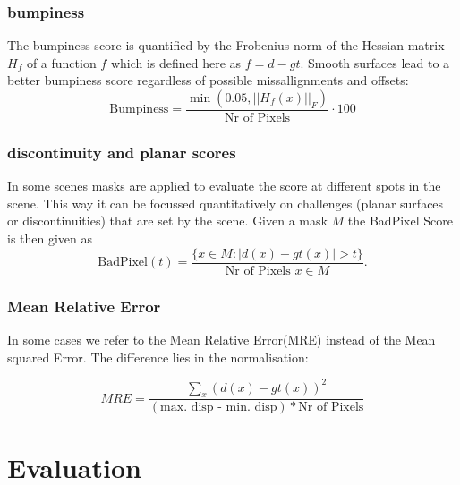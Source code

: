 \documentclass  [
  paper    = a4,
  BCOR     = 10mm,
  twoside,
  fontsize = 12pt,
  fleqn,
  toc      = bibnumbered,
  toc      = listofnumbered,
  numbers  = noendperiod,
  headings = normal,
  listof   = leveldown,
  version  = 3.03
]                                       {scrreprt}
\begin{document}
\subsection{bumpiness}
The bumpiness score is quantified by the Frobenius norm of the Hessian matrix $H_f$ of a function $f$ which is defined here as $f = d-gt$. Smooth surfaces lead to a better bumpiness score regardless of possible missallignments and offsets:
\begin{equation}\label{key}
\text{Bumpiness} = \frac{\min(0.05, ||H_f(x)||_F)}{\text{Nr of Pixels}} \cdot 100
\end{equation}
\subsection{discontinuity and planar scores}
In some scenes masks are applied to evaluate the score at different spots in the scene. This way it can be focussed quantitatively on challenges (planar surfaces or discontinuities) that are set by the scene. Given a mask $M$ the BadPixel Score is then given as 
\begin{equation}\label{key}
\text{BadPixel}(t) = \frac{\{x \in M:|d(x) - gt(x)| > t \}}{\text{Nr of Pixels }x \in M}.
\end{equation}
\subsection{Mean Relative Error}
In some cases we refer to the Mean Relative Error(MRE) instead of the Mean squared Error. The difference lies in the normalisation:

\begin{equation}\label{key}
MRE = \frac{\sum_{x} (d(x) - gt(x) )^2}{(\text{max. disp - min. disp})* \text{Nr of Pixels}}
\end{equation}



\chapter{Evaluation}
\label{Evaluation}
\end{document}

